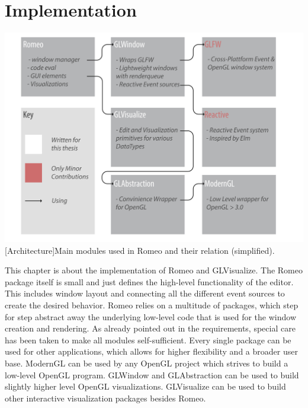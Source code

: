\section{Implementation}

\vspace{1em}
\begin{minipage}{\linewidth}
    \centering
    \includegraphics[width=0.9\linewidth]{graphics/architecture.pdf}
    [Architecture]{Main modules used in Romeo and their relation (simplified).}
    \label{fig:architecture} 
\end{minipage}


This chapter is about the implementation of Romeo and GLVisualize.
The Romeo package itself is small and just defines the high-level functionality of the editor.
This includes window layout and connecting all the different event sources to create the desired behavior.
Romeo relies on a multitude of packages, which step for step abstract away the underlying low-level code that is used for the window creation and rendering. 
As already pointed out in the requirements, special care has been taken to make all modules self-sufficient. 
Every single package can be used for other applications, which allows for higher flexibility and a broader user base.
ModernGL can be used by any OpenGL project which strives to build a low-level OpenGL program.
GLWindow and GLAbstraction can be used to build slightly higher level OpenGL visualizations. 
GLVisualize can be used to build other interactive visualization packages besides Romeo.

